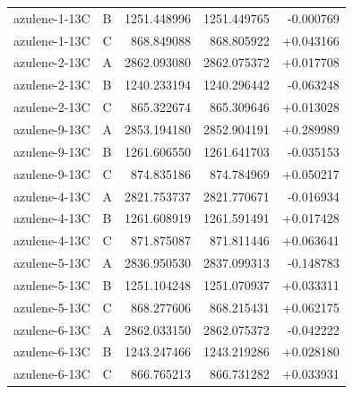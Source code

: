\documentclass[12pt]{article}
\begin{document}
\begin{longtable}{llrrr}
azulene-1-13C & B & 1251.448996 & 1251.449765 & -0.000769 \\
azulene-1-13C & C & 868.849088 & 868.805922 & +0.043166 \\
azulene-2-13C & A & 2862.093080 & 2862.075372 & +0.017708 \\
azulene-2-13C & B & 1240.233194 & 1240.296442 & -0.063248 \\
azulene-2-13C & C & 865.322674 & 865.309646 & +0.013028 \\
azulene-9-13C & A & 2853.194180 & 2852.904191 & +0.289989 \\
azulene-9-13C & B & 1261.606550 & 1261.641703 & -0.035153 \\
azulene-9-13C & C & 874.835186 & 874.784969 & +0.050217 \\
azulene-4-13C & A & 2821.753737 & 2821.770671 & -0.016934 \\
azulene-4-13C & B & 1261.608919 & 1261.591491 & +0.017428 \\
azulene-4-13C & C & 871.875087 & 871.811446 & +0.063641 \\
azulene-5-13C & A & 2836.950530 & 2837.099313 & -0.148783 \\
azulene-5-13C & B & 1251.104248 & 1251.070937 & +0.033311 \\
azulene-5-13C & C & 868.277606 & 868.215431 & +0.062175 \\
azulene-6-13C & A & 2862.033150 & 2862.075372 & -0.042222 \\
azulene-6-13C & B & 1243.247466 & 1243.219286 & +0.028180 \\
azulene-6-13C & C & 866.765213 & 866.731282 & +0.033931 \\
\bottomrule
\end{longtable}
\end{document}
